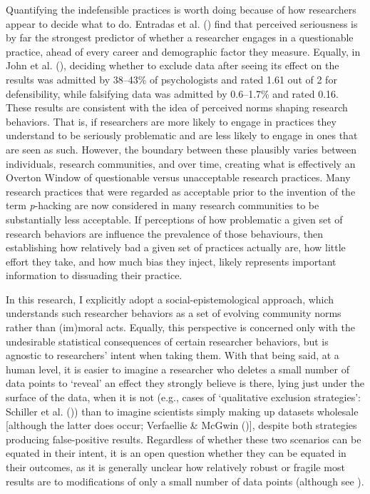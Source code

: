 \documentclass[
  nonatbib,
  authoryear,
  preprint]{elsarticle}
\begin{document}
Quantifying the indefensible practices is worth doing because of how
researchers appear to decide what to do. Entradas et al.
() find that perceived
seriousness is by far the strongest predictor of whether a researcher
engages in a questionable practice, ahead of every career and
demographic factor they measure. Equally, in John et al.
(), deciding whether to exclude
data after seeing its effect on the results was admitted by 38--43\% of
psychologists and rated 1.61 out of 2 for defensibility, while
falsifying data was admitted by 0.6--1.7\% and rated 0.16. These results
are consistent with the idea of perceived norms shaping research
behaviors. That is, if researchers are more likely to engage in
practices they understand to be seriously problematic and are less
likely to engage in ones that are seen as such. However, the boundary
between these plausibly varies between individuals, research
communities, and over time, creating what is effectively an Overton
Window of questionable versus unacceptable research practices. Many
research practices that were regarded as acceptable prior to the
invention of the term \emph{p}-hacking are now considered in many
research communities to be substantially less acceptable. If perceptions
of how problematic a given set of research behaviors are influence the
prevalence of those behaviours, then establishing how relatively bad a
given set of practices actually are, how little effort they take, and
how much bias they inject, likely represents important information to
dissuading their practice.

In this research, I explicitly adopt a social-epistemological approach,
which understands such researcher behaviors as a set of evolving
community norms rather than (im)moral acts. Equally, this perspective is
concerned only with the undesirable statistical consequences of certain
researcher behaviors, but is agnostic to researchers' intent when taking
them. With that being said, at a human level, it is easier to imagine a
researcher who deletes a small number of data points to `reveal' an
effect they strongly believe is there, lying just under the surface of
the data, when it is not (e.g., cases of `qualitative exclusion
strategies': Schiller et al.
()) than to imagine
scientists simply making up datasets wholesale {[}although the latter
does occur; Verfaellie \& McGwin
(){]}, despite both strategies
producing false-positive results. Regardless of whether these two
scenarios can be equated in their intent, it is an open question whether
they can be equated in their outcomes, as it is generally unclear how
relatively robust or fragile most results are to modifications of only a
small number of data points (although see
).
\end{document}
